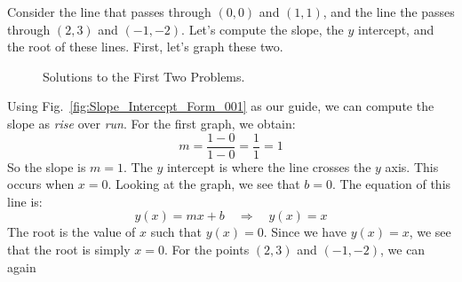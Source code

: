 \documentclass[crop=false,class=book,oneside]{standalone}                      %
\begin{document}
            \begin{lexample}
                Consider the line that passes through $(0,0)$ and $(1,1)$, and
                the line the passes through $(2,3)$ and $(\minus{1},\minus{2})$.
                Let's compute the slope, the $y$ intercept, and the root of
                these lines. First, let's graph these two.
                \begin{figure}
                    \centering
                    \captionsetup{type=figure}
                    \begin{subfigure}[b]{0.49\textwidth}
                        \centering
                    \end{subfigure}
                    \begin{subfigure}[b]{0.49\textwidth}
                        \centering
                    \end{subfigure}
                    \caption{Solutions to the First Two Problems.}
                    \label{fig:Solutions_to_First_Two_Problems}
                \end{figure}
                Using Fig.~\ref{fig:Slope_Intercept_Form_001} as our guide,
                we can compute the slope as \textit{rise} over \textit{run}.
                For the first graph, we obtain:
                \begin{equation}
                    m=\frac{1-0}{1-0}=\frac{1}{1}=1
                \end{equation}
                So the slope is $m=1$. The $y$ intercept is where the line
                crosses the $y$ axis. This occurs when $x=0$. Looking
                at the graph, we see that $b=0$. The equation of this line is:
                \begin{equation}
                    y(x)=mx+b
                    \quad\Longrightarrow\quad
                    y(x)=x
                \end{equation}
                The root is the value of $x$ such that $y(x)=0$. Since we
                have $y(x)=x$, we see that the root is simply $x=0$.
                For the points $(2,3)$ and $(\minus{1},\minus{2})$, we can again

\end{lexample}
\end{document}
